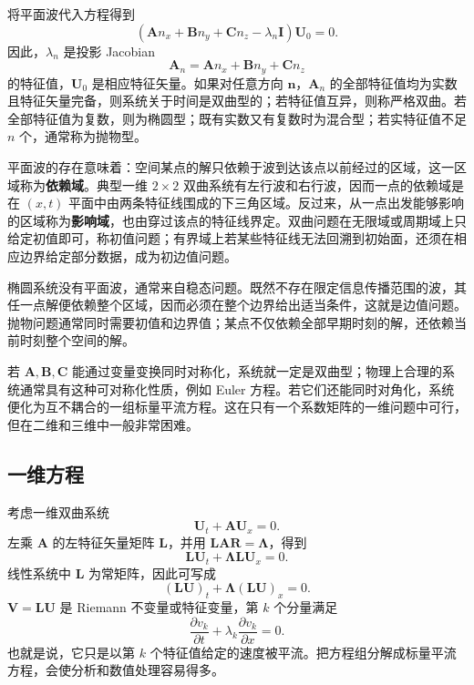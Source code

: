 \documentclass[11pt,a4paper,openany,fontset=none]{ctexbook}
\begin{document}
将平面波代入方程得到
\begin{equation}
 (\bm A n_x+\bm B n_y+\bm C n_z-\lambda_n\bm I)\bm U_0=0. \tag{1.16.5}
\end{equation}
因此，$\lambda_n$ 是投影 Jacobian
\begin{equation}
 \bm A_n=\bm A n_x+\bm B n_y+\bm C n_z \tag{1.16.6}
\end{equation}
的特征值，$\bm U_0$ 是相应特征矢量。如果对任意方向 $\bm n$，$\bm A_n$ 的全部特征值均为实数且特征矢量完备，则系统关于时间是双曲型的；若特征值互异，则称严格双曲。若全部特征值为复数，则为椭圆型；既有实数又有复数时为混合型；若实特征值不足 $n$ 个，通常称为抛物型。

平面波的存在意味着：空间某点的解只依赖于波到达该点以前经过的区域，这一区域称为\textbf{依赖域}。典型一维 $2\times2$ 双曲系统有左行波和右行波，因而一点的依赖域是在 $(x,t)$ 平面中由两条特征线围成的下三角区域。反过来，从一点出发能够影响的区域称为\textbf{影响域}，也由穿过该点的特征线界定。双曲问题在无限域或周期域上只给定初值即可，称初值问题；有界域上若某些特征线无法回溯到初始面，还须在相应边界给定部分数据，成为初边值问题。

椭圆系统没有平面波，通常来自稳态问题。既然不存在限定信息传播范围的波，其任一点解便依赖整个区域，因而必须在整个边界给出适当条件，这就是边值问题。抛物问题通常同时需要初值和边界值；某点不仅依赖全部早期时刻的解，还依赖当前时刻整个空间的解。

若 $\bm A,\bm B,\bm C$ 能通过变量变换同时对称化，系统就一定是双曲型；物理上合理的系统通常具有这种可对称化性质，例如 Euler 方程。若它们还能同时对角化，系统便化为互不耦合的一组标量平流方程。这在只有一个系数矩阵的一维问题中可行，但在二维和三维中一般非常困难。

\subsection{一维方程}

考虑一维双曲系统
\begin{equation}
 \bm U_t+\bm A\bm U_x=0. \tag{1.16.7}
\end{equation}
左乘 $\bm A$ 的左特征矢量矩阵 $\bm L$，并用 $\bm L\bm A\bm R=\bm\Lambda$，得到
\begin{equation}
 \bm L\bm U_t+\bm\Lambda\bm L\bm U_x=0. \tag{1.16.9}
\end{equation}
线性系统中 $\bm L$ 为常矩阵，因此可写成
\begin{equation}
 (\bm L\bm U)_t+\bm\Lambda(\bm L\bm U)_x=0. \tag{1.16.10}
\end{equation}
$\bm V=\bm L\bm U$ 是 Riemann 不变量或特征变量，第 $k$ 个分量满足
\begin{equation}
 \frac{\partial v_k}{\partial t}+\lambda_k\frac{\partial v_k}{\partial x}=0. \tag{1.16.11}
\end{equation}
也就是说，它只是以第 $k$ 个特征值给定的速度被平流。把方程组分解成标量平流方程，会使分析和数值处理容易得多。
\end{document}
